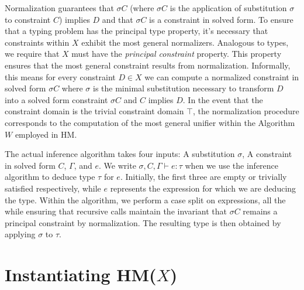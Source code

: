\documentclass[runningheads]{llncs}
\newcommand{\hmx}{HM($X$)}
\begin{document}
Normalization
guarantees that $σC$ (where $σC$ is the application of substitution $σ$
to constraint $C$) implies $D$ and that $σC$ is a constraint in solved form.
To ensure that a typing problem has the principal type property, it's
necessary that constraints within $X$ exhibit the most general normalizers.
Analogous to types, we require that $X$ must have the
\emph{principal constraint} property.
This property ensures that the most general constraint results from
normalization.
Informally, this means for every constraint $D ∈ X$ we can compute a
normalized constraint in solved form $σC$ where $σ$ is the minimal
substitution necessary to transform $D$ into a solved form constraint $σC$
and $C$ implies $D$.
In the event that the constraint domain is the trivial constraint domain
$\top$, the normalization procedure corresponds to the computation of the
most general unifier within the Algorithm $W$ employed in HM.

The actual inference algorithm takes four inputs: A substitution $σ$, A
constraint in solved form $C$, $Γ$, and $e$.
We write $σ, C, Γ ⊢ e : τ$ when we use the inference algorithm to deduce
type $τ$ for $e$.
Initially, the first three are empty or trivially satisfied respectively, while
$e$ represents the expression for which we are deducing the type.
Within the algorithm, we perform a case split on expressions, all the
while ensuring that recursive calls maintain the invariant that $σC$
remains a principal constraint by normalization.
The resulting type is then obtained by applying $σ$ to $τ$.

\section{Instantiating \hmx{}}
\end{document}
